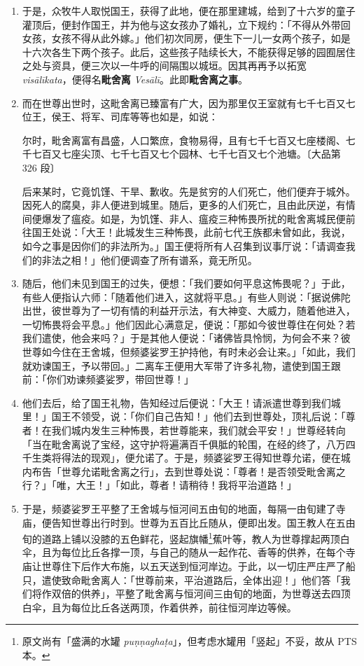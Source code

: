 \begin{enumerate}
\item 于是，众牧牛人取悦国王，获得了此地，便在那里建城，给到了十六岁的童子灌顶后，便封作国王，并为他与这女孩办了婚礼，立下规约：「不得从外带回女孩，女孩不得从此外嫁。」他们初次同房，便生下一儿一女两个孩子，如是十六次各生下两个孩子。此后，这些孩子陆续长大，不能获得足够的园囿居住之处与资具，便三次以一牛呼的间隔围以城垣。因其再再予以拓宽 \textit{visālīkata}，便得名\textbf{毗舍离} \textit{Vesālī}。此即\textbf{毗舍离之事}。
\item 而在世尊出世时，这毗舍离已臻富有广大，因为那里仅王室就有七千七百又七位王，侯王、将军、司库等等也如是，如说：\begin{quoting}尔时，毗舍离富有昌盛，人口繁庶，食物易得，且有七千七百又七座楼阁、七千七百又七座尖顶、七千七百又七个园林、七千七百又七个池塘。{\bluefootnotesize 〔大品第 326 段〕}\end{quoting}后来某时，它竟饥馑、干旱、歉收。先是贫穷的人们死亡，他们便弃于城外。因死人的腐臭，非人便进到城里。随后，更多的人们死亡，且由此厌逆，有情间便爆发了瘟疫。如是，为饥馑、非人、瘟疫三种怖畏所扰的毗舍离城民便前往国王处说：「大王！此城发生三种怖畏，此前七代王族都未曾如此，我说，如今之事是因你们的非法所为。」国王便将所有人召集到议事厅说：「请调查我们的非法之相！」他们便调查了所有谱系，竟无所见。
\item 随后，他们未见到国王的过失，便想：「我们要如何平息这怖畏呢？」于此，有些人便指认六师：「随着他们进入，这就将平息。」有些人则说：「据说佛陀出世，彼世尊为了一切有情的利益开示法，有大神变、大威力，随着他进入，一切怖畏将会平息。」他们因此心满意足，便说：「那如今彼世尊住在何处？若我们遣使，他会来吗？」于是其他人便说：「诸佛皆具怜悯，为何会不来？彼世尊如今住在王舍城，但频婆娑罗王护持他，有时未必会让来。」「如此，我们就劝谏国王，予以带回。」二离车王便用大军带了许多礼物，遣使到国王跟前：「你们劝谏频婆娑罗，带回世尊！」
\item 他们去后，给了国王礼物，告知经过后便说：「大王！请派遣世尊到我们城里！」国王不领受，说：「你们自己告知！」他们去到世尊处，顶礼后说：「尊者！在我们城内发生三种怖畏，若世尊能来，我们就会平安！」世尊经转向「当在毗舍离说了宝经，这守护将遍满百千俱胝的轮围，在经的终了，八万四千生类将得法的现观」，便允诺了。于是，频婆娑罗王得知世尊允诺，便在城内布告「世尊允诺毗舍离之行」，去到世尊处说：「尊者！是否领受毗舍离之行？」「唯，大王！」「如此，尊者！请稍待！我将平治道路！」
\item 于是，频婆娑罗王平整了王舍城与恒河间五由旬的地面，每隔一由旬建了寺庙，便告知世尊出行时到。世尊为五百比丘随从，便即出发。国王教人在五由旬的道路上铺以没膝的五色鲜花，竖起旗幡\footnote{原文尚有「盛满的水罐 \textit{puṇṇaghaṭa}」，但考虑水罐用「竖起」不妥，故从 PTS 本。}蕉叶等，教人为世尊撑起两顶白伞，且为每位比丘各撑一顶，与自己的随从一起作花、香等的供养，在每个寺庙让世尊住下后作大布施，以五天送到恒河岸边。于此，以一切庄严庄严了船只，遣使致命毗舍离人：「世尊前来，平治道路后，全体出迎！」他们答「我们将作双倍的供养」，平整了毗舍离与恒河间三由旬的地面，为世尊送去四顶白伞，且为每位比丘各送两顶，作着供养，前往恒河岸边等候。

\end{enumerate}
